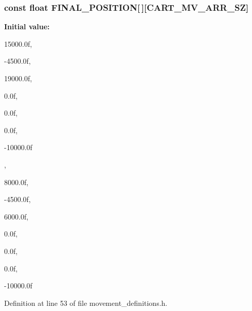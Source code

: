 \subsubsection[{\-F\-I\-N\-A\-L\-\_\-\-P\-O\-S\-I\-T\-I\-O\-N}]{\setlength{\rightskip}{0pt plus 5cm}const float {\bf \-F\-I\-N\-A\-L\-\_\-\-P\-O\-S\-I\-T\-I\-O\-N}[$\,$][{\bf \-C\-A\-R\-T\-\_\-\-M\-V\-\_\-\-A\-R\-R\-\_\-\-S\-Z}]}\label{movement__definitions_8h_a5fe0052a1578f9613671455a0e91a77b}
{\bfseries \-Initial value\-:}
\begin{DoxyCode}
 { { 15000.0f,
                                                                               
          -4500.0f,
                                                                               
          19000.0f,
                                                                               
              0.0f,
                                                                               
              0.0f,
                                                                               
              0.0f,
                                                                               
         -10000.0f },
                                                                               
        {  8000.0f,
                                                                               
          -4500.0f,
                                                                               
           6000.0f,
                                                                               
              0.0f,
                                                                               
              0.0f,
                                                                               
              0.0f,
                                                                               
         -10000.0f } }
\end{DoxyCode}


\-Definition at line 53 of file movement\-\_\-definitions.\-h.

